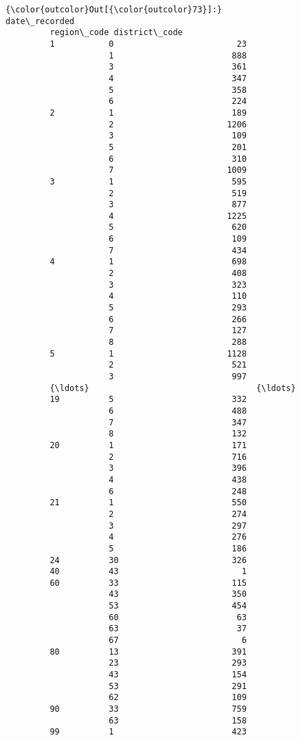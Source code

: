 \documentclass[11pt]{article}
\begin{document}
\begin{Verbatim}[commandchars=\\\{\}]
{\color{outcolor}Out[{\color{outcolor}73}]:}                            date\_recorded
         region\_code district\_code               
         1           0                         23
                     1                        888
                     3                        361
                     4                        347
                     5                        358
                     6                        224
         2           1                        189
                     2                       1206
                     3                        109
                     5                        201
                     6                        310
                     7                       1009
         3           1                        595
                     2                        519
                     3                        877
                     4                       1225
                     5                        620
                     6                        109
                     7                        434
         4           1                        698
                     2                        408
                     3                        323
                     4                        110
                     5                        293
                     6                        266
                     7                        127
                     8                        288
         5           1                       1128
                     2                        521
                     3                        997
         {\ldots}                                  {\ldots}
         19          5                        332
                     6                        488
                     7                        347
                     8                        132
         20          1                        171
                     2                        716
                     3                        396
                     4                        438
                     6                        248
         21          1                        550
                     2                        274
                     3                        297
                     4                        276
                     5                        186
         24          30                       326
         40          43                         1
         60          33                       115
                     43                       350
                     53                       454
                     60                        63
                     63                        37
                     67                         6
         80          13                       391
                     23                       293
                     43                       154
                     53                       291
                     62                       109
         90          33                       759
                     63                       158
         99          1                        423
         

\end{Verbatim}
\end{document}
